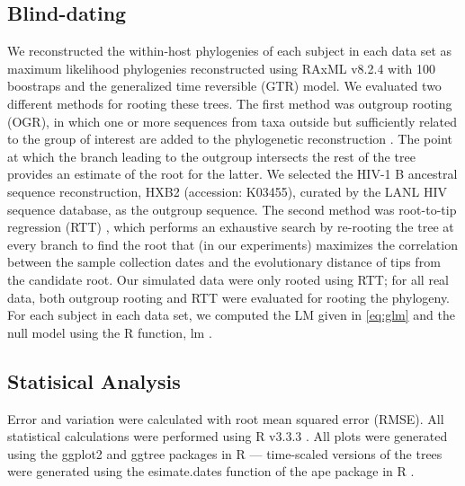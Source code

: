 \documentclass[12pt,onecolumn,twoside]{pnas-new}
\begin{document}
{\subsection*{Blind-dating}
We reconstructed the within-host phylogenies of each subject in each data set as maximum likelihood phylogenies reconstructed using RAxML v8.2.4 \cite{raxml} with 100 boostraps and the generalized time reversible (GTR) model.
We evaluated two different methods for rooting these trees. 
The first method was outgroup rooting (OGR), in which one or more sequences from taxa outside but sufficiently related to the group of interest are added to the phylogenetic reconstruction \cite{Huelsenbeck02}.
The point at which the branch leading to the outgroup intersects the rest of the tree provides an estimate of the root for the latter.
We selected the HIV-1 B ancestral sequence reconstruction, HXB2 (accession: K03455), curated by the LANL HIV sequence database, as the outgroup sequence.
The second method was root-to-tip regression (RTT) \cite{Korber00}, which performs an exhaustive search by re-rooting the tree at every branch to find the root that (in our experiments) maximizes the correlation between the sample collection dates and the evolutionary distance of tips from the candidate root.
Our simulated data were only rooted using RTT; for all real data, both outgroup rooting and RTT were evaluated for rooting the phylogeny.
For each subject in each data set, we computed the LM given in \cref{eq:glm} and the null model using the R function, lm \cite{rscript}.
\subsection*{Statisical Analysis}
Error and variation were calculated with root mean squared error (RMSE).
All statistical calculations were performed using R v3.3.3 \cite{rscript}.
All plots were generated using the ggplot2 and ggtree packages in R \cite{ggplot,ggtree} --- time-scaled versions of the trees were generated using the esimate.dates function of the ape package in R \cite{ape,nodedating}.
}

\showmatmethods{} %





\end{document}
